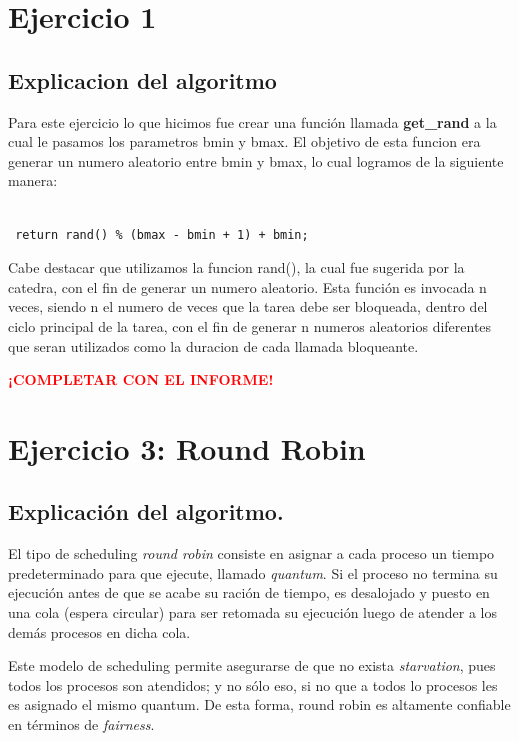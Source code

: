 \documentclass[a4paper]{article}
\begin{document}
\newpage


 \section{Ejercicio 1}

 \subsection{Explicacion del algoritmo}
 Para este ejercicio lo que hicimos fue crear una funci\'on llamada
 \textbf{get\_rand} a la cual le pasamos los parametros bmin y bmax. El
 objetivo de esta funcion era generar un numero aleatorio entre bmin y bmax,
 lo cual logramos de la siguiente manera:
 \begin{verbatim}

 return rand() % (bmax - bmin + 1) + bmin;

 \end{verbatim}

 Cabe destacar que utilizamos la funcion rand(), la cual fue sugerida por la
 catedra, con el fin de generar un numero aleatorio.
 Esta funci\'on es invocada n veces, siendo n el numero de veces que la
 tarea debe ser bloqueada, dentro del ciclo principal de la tarea, con el
 fin de generar n numeros aleatorios diferentes que seran utilizados como la
 duracion de cada llamada bloqueante.




\textbf{\textcolor{red}{¡COMPLETAR CON EL INFORME!}}

\section{Ejercicio 3: Round Robin}

\subsection{Explicación del algoritmo.}
El tipo de scheduling \textit{round robin} consiste en asignar a cada proceso un
tiempo predeterminado para que ejecute, llamado \textit{quantum}. Si el proceso no termina su ejecución antes de que se
acabe su ración de tiempo, es desalojado y puesto en una cola (espera
circular) para ser retomada su ejecución luego de atender a los demás
procesos en dicha cola.

Este modelo de scheduling permite asegurarse de que no exista
\textit{starvation}, pues todos los procesos son atendidos; y no sólo eso,
si no que a todos lo procesos les es asignado el mismo quantum. De esta
forma, round robin es altamente confiable en términos de \textit{fairness}.
\end{document}
